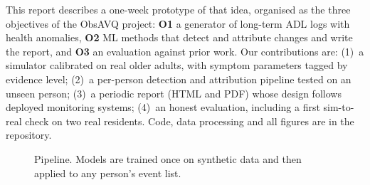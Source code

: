 \documentclass[10pt,a4paper]{article}
\begin{document}
This report describes a one-week prototype of that idea, organised as the three objectives of the ObsAVQ project:
\textbf{O1} a generator of long-term ADL logs with health anomalies, \textbf{O2} ML methods that detect and attribute
changes and write the report, and \textbf{O3} an evaluation against prior work. Our contributions are:
(1)~a simulator calibrated on real older adults, with symptom parameters tagged by evidence level;
(2)~a per-person detection and attribution pipeline tested on an unseen person;
(3)~a periodic report (HTML and PDF) whose design follows deployed monitoring systems;
(4)~an honest evaluation, including a first sim-to-real check on two real residents.
Code, data processing and all figures are in the repository.

\begin{figure}[h]
\centering
{}
\caption{Pipeline. Models are trained once on synthetic data and then applied to any person's event list.}
\label{fig:pipeline}
\end{figure}

\end{document}
